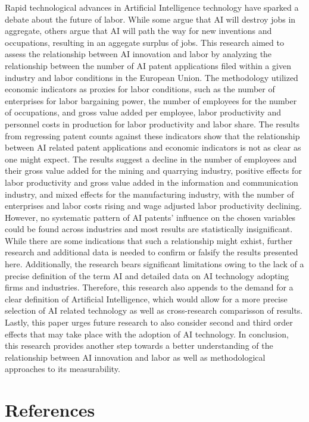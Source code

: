 \documentclass[
  12pt,
  a4paperpaper,
]{article}
\begin{document}
Rapid technological advances in Artificial Intelligence technology have
sparked a debate about the future of labor. While some argue that AI
will destroy jobs in aggregate, others argue that AI will path the way
for new inventions and occupations, resulting in an aggegate surplus of
jobs. This research aimed to assess the relationship between AI
innovation and labor by analyzing the relationship between the number of
AI patent applications filed within a given industry and labor
conditions in the European Union. The methodology utilized economic
indicators as proxies for labor conditions, such as the number of
enterprises for labor bargaining power, the number of employees for the
number of occupations, and gross value added per employee, labor
productivity and personnel costs in production for labor productivity
and labor share. The results from regressing patent counts against these
indicators show that the relationship between AI related patent
applications and economic indicators is not as clear as one might
expect. The results suggest a decline in the number of employees and
their gross value added for the mining and quarrying industry, positive
effects for labor productivity and gross value added in the information
and communication industry, and mixed effects for the manufacturing
industry, with the number of enterprises and labor costs rising and wage
adjusted labor productivity declining. However, no systematic pattern of
AI patents' influence on the chosen variables could be found across
industries and most results are statistically insignificant. While there
are some indications that such a relationship might exhist, further
research and additional data is needed to confirm or falsify the results
presented here. Additionally, the research bears significant limitations
owing to the lack of a precise definition of the term AI and detailed
data on AI technology adopting firms and industries. Therefore, this
research also appends to the demand for a clear definition of Artificial
Intelligence, which would allow for a more precise selection of AI
related technology as well as cross-research comparisson of results.
Lastly, this paper urges future research to also consider second and
third order effects that may take place with the adoption of AI
technology. In conclusion, this research provides another step towards a
better understanding of the relationship between AI innovation and labor
as well as methodological approaches to its measurability.

\newpage{}

\section*{References}\label{sec-references}
\end{document}
